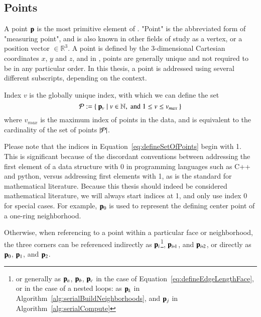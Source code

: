 \subsection{Points}
\label{ch2s3ssP}
A point $\mathbf{p}$ is the most primitive element of \tdd{}. "Point" is the abbreviated form of "measuring point", and is also known in other fields of study as a vertex, or a position vector $\in \mathbb{R}^3$. A point is defined by the 3-dimensional Cartesian coordinates $x$, $y$ and $z$, and in \tdd{}, points are generally unique and not required to be in any particular order. In this thesis, a point is addressed using several different subscripts, depending on the context.

Index $v$ is the globally unique index, with which we can define the set
\begin{equation}
	\mathcal{P} := \left \{\:\mathbf{p}_v \mid v \in \mathbb{N}, \;\text{and}\; 1\leq v \leq v_{max}\:\right \}
	\label{eq:defineSetOfPoints}
\end{equation}
where $v_{max}$ is the maximum index of points in the data, and is equivalent to the cardinality of the set of points $|\mathcal{P}|$.%
%
%

Please note that the indices in Equation~\ref{eq:defineSetOfPoints} begin with 1. This is significant because of the discordant conventions between addressing the first element of a data structure with 0 in programming languages such as C++ and python, versus addressing first elements with 1, as is the standard for mathematical literature. Because this thesis should indeed be considered mathematical literature, we will always start indices at 1, and only use index 0 for special cases. For example, $\mathbf{p}_0$ is used to represent the defining center point of a one-ring neighborhood.

Otherwise,
 when referencing to a point within a particular face or neighborhood, the three corners can be referenced indirectly as $\mathbf{p}_i$\footnote{or generally as $\mathbf{p}_a$, $\mathbf{p}_b$, $\mathbf{p}_c$ in the case of Equation~\ref{eq:defineEdgeLengthFace}, or in the case of a nested loops: as $\mathbf{p}_k$ in Algorithm~\ref{alg:serialBuildNeighborhoods}, and $\mathbf{p}_j$ in Algorithm~\ref{alg:serialCompute}}, $\bp_{\sipo}$, and $\bp_{\sipt}$, or directly as $\mathbf{p}_0$, $\mathbf{p}_1$, and $\mathbf{p}_2$.%
%
%
